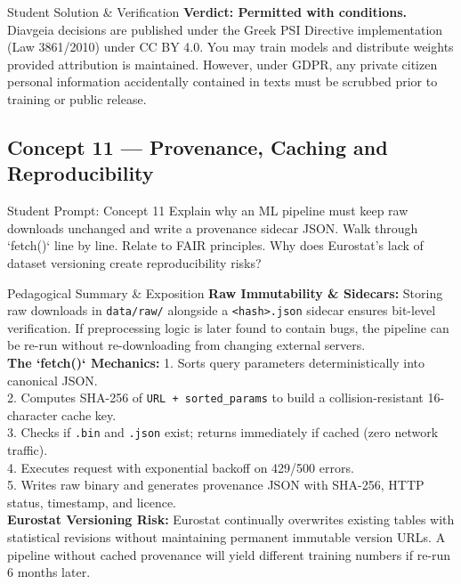 \documentclass[11pt,a4paper]{article}
\begin{document}
\begin{evalbox}{Student Solution \& Verification}
\textbf{Verdict: Permitted with conditions.}\\
Diavgeia decisions are published under the Greek PSI Directive implementation (Law 3861/2010) under CC BY 4.0. You may train models and distribute weights provided attribution is maintained. However, under GDPR, any private citizen personal information accidentally contained in texts must be scrubbed prior to training or public release.
\end{evalbox}

\subsection{Concept 11 --- Provenance, Caching and Reproducibility}
\begin{promptbox}{Student Prompt: Concept 11}
Explain why an ML pipeline must keep raw downloads unchanged and write a provenance sidecar JSON. Walk through `fetch()` line by line. Relate to FAIR principles. Why does Eurostat's lack of dataset versioning create reproducibility risks?
\end{promptbox}

\begin{evalbox}{Pedagogical Summary \& Exposition}
\textbf{Raw Immutability \& Sidecars:} Storing raw downloads in \texttt{data/raw/} alongside a \texttt{<hash>.json} sidecar ensures bit-level verification. If preprocessing logic is later found to contain bugs, the pipeline can be re-run without re-downloading from changing external servers.\\
\textbf{The `fetch()` Mechanics:}
1. Sorts query parameters deterministically into canonical JSON.\\
2. Computes SHA-256 of \texttt{URL + sorted\_params} to build a collision-resistant 16-character cache key.\\
3. Checks if \texttt{.bin} and \texttt{.json} exist; returns immediately if cached (zero network traffic).\\
4. Executes request with exponential backoff on 429/500 errors.\\
5. Writes raw binary and generates provenance JSON with SHA-256, HTTP status, timestamp, and licence.\\
\textbf{Eurostat Versioning Risk:} Eurostat continually overwrites existing tables with statistical revisions without maintaining permanent immutable version URLs. A pipeline without cached provenance will yield different training numbers if re-run 6 months later.
\end{evalbox}
\end{document}
